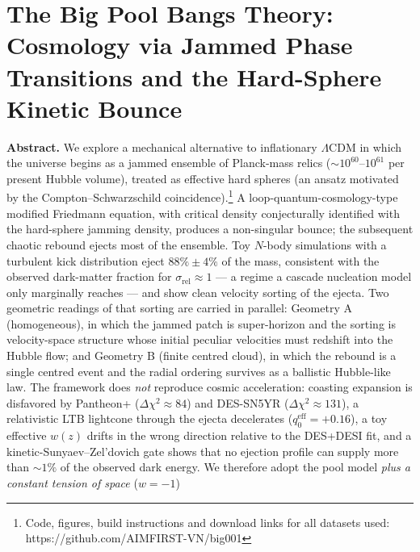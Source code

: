 \documentclass[
]{article}
\author{}
\date{}
\begin{document}
\hypertarget{the-big-pool-bangs-theory-cosmology-via-jammed-phase-transitions-and-the-hard-sphere-kinetic-bounce}{%
\section{\texorpdfstring{\textbf{The Big Pool Bangs Theory: Cosmology
via Jammed Phase Transitions and the Hard-Sphere Kinetic
Bounce}}{The Big Pool Bangs Theory: Cosmology via Jammed Phase Transitions and the Hard-Sphere Kinetic Bounce}}\label{the-big-pool-bangs-theory-cosmology-via-jammed-phase-transitions-and-the-hard-sphere-kinetic-bounce}}

\textbf{Abstract.} We explore a mechanical alternative to inflationary
\(\Lambda\)CDM in which the universe begins as a jammed ensemble of
Planck-mass relics (\(\sim\!10^{60}\)--\(10^{61}\) per present Hubble
volume), treated as effective hard spheres (an ansatz motivated by the
Compton--Schwarzschild coincidence).\footnote{Code, figures, build
  instructions and download links for all datasets used:
  https://github.com/AIMFIRST-VN/big001} A loop-quantum-cosmology-type
modified Friedmann equation, with critical density conjecturally
identified with the hard-sphere jamming density, produces a non-singular
bounce; the subsequent chaotic rebound ejects most of the ensemble. Toy
\(N\)-body simulations with a turbulent kick distribution eject
\(88\% \pm 4\%\) of the mass, consistent with the observed dark-matter
fraction for \(\sigma_{\text{rel}} \approx 1\) --- a regime a cascade
nucleation model only marginally reaches --- and show clean velocity
sorting of the ejecta. Two geometric readings of that sorting are
carried in parallel: Geometry A (homogeneous), in which the jammed patch
is super-horizon and the sorting is velocity-space structure whose
initial peculiar velocities must redshift into the Hubble flow; and
Geometry B (finite centred cloud), in which the rebound is a single
centred event and the radial ordering survives as a ballistic
Hubble-like law. The framework does \emph{not} reproduce cosmic
acceleration: coasting expansion is disfavored by Pantheon+
(\(\Delta\chi^2 \approx 84\)) and DES-SN5YR
(\(\Delta\chi^2 \approx 131\)), a relativistic LTB lightcone through the
ejecta decelerates (\(q_0^{\text{eff}} = +0.16\)), a toy effective
\(w(z)\) drifts in the wrong direction relative to the DES+DESI fit, and
a kinetic-Sunyaev--Zel'dovich gate shows that no ejection profile can
supply more than \(\sim\!1\%\) of the observed dark energy. We therefore
adopt the pool model \emph{plus a constant tension of space} (\(w=-1\))
\end{document}
